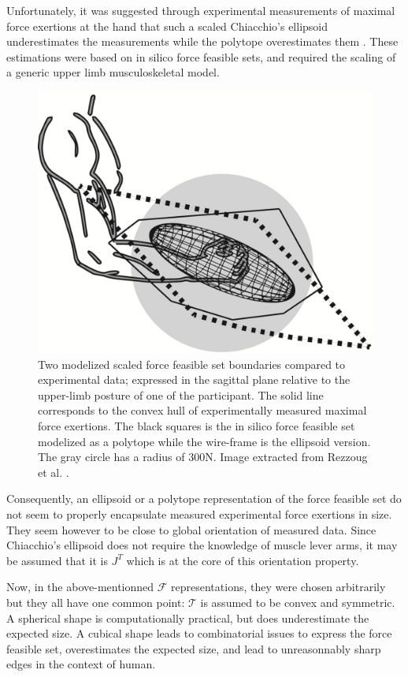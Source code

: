 \begin{figure}[!htb]
    \label{fig:tension_models}
\end{figure}

Unfortunately, it was suggested through experimental measurements of maximal force exertions at the hand that such a scaled Chiacchio's ellipsoid underestimates the measurements while the polytope overestimates them \cite{rezzougUpperLimbIsometricForce2021b}. These estimations were based on in silico force feasible sets, and required the scaling of a generic upper limb musculoskeletal model. 

\begin{figure}[!htb]
    \captionsetup{justification=centering}
        \centering
        \includegraphics[trim={0 0 0 0}, clip, width=0.5\linewidth]{img/chapter_3/FFSComparisonRezzoug.png}
    \caption{Two modelized scaled force feasible set boundaries compared to experimental data; expressed in the sagittal plane relative to the upper-limb posture of one of the participant. The solid line corresponds to the convex hull of experimentally measured maximal force exertions. The black squares is the in silico force feasible set modelized as a polytope while the wire-frame is the ellipsoid version. The gray circle has a radius of 300N. Image extracted from Rezzoug et al. \cite{rezzougUpperLimbIsometricForce2021b}.}
    \label{fig:rezzoug_exp}
\end{figure}

Consequently, an ellipsoid or a polytope representation of the force feasible set do not seem to properly encapsulate measured experimental force exertions in size. They seem however to be close to global orientation of measured data. Since Chiacchio's ellipsoid does not require the knowledge of muscle lever arms, it may be assumed that it is $J^T$ which is at the core of this orientation property.

Now, in the above-mentionned $\mathcal{F}$ representations, they were chosen arbitrarily but they all have one common point: $\mathcal{T}$ is assumed to be convex and symmetric. A spherical shape is computationally practical, but does underestimate the expected size. A cubical shape leads to combinatorial issues to express the force feasible set, overestimates the expected size, and lead to unreasonnably sharp edges in the context of human. 

